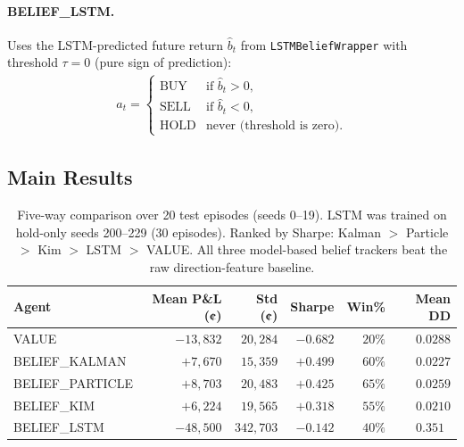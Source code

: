 \documentclass[11pt]{article}
\begin{document}
\paragraph{BELIEF\_LSTM.}
Uses the LSTM-predicted future return $\hat{b}_t$ from \texttt{LSTMBeliefWrapper}
with threshold $\tau = 0$ (pure sign of prediction):
\begin{align*}
a_t = \begin{cases}
\text{BUY}  & \text{if } \hat{b}_t > 0, \\
\text{SELL} & \text{if } \hat{b}_t < 0, \\
\text{HOLD} & \text{never (threshold is zero).}
\end{cases}
\end{align*}

\subsection{Main Results}
\label{sec:results}

\begin{table}[H]
\centering
\begin{tabular}{lrrrrr}
\toprule
\textbf{Agent} & \textbf{Mean P\&L (¢)} & \textbf{Std (¢)} & \textbf{Sharpe} & \textbf{Win\%} & \textbf{Mean DD} \\
\midrule
VALUE            & $-13{,}832$  & $20{,}284$  & $-0.682$ & $20\%$ & $0.0288$ \\
BELIEF\_KALMAN   & $+7{,}670$   & $15{,}359$  & $+0.499$ & $60\%$ & $0.0227$ \\
BELIEF\_PARTICLE & $+8{,}703$   & $20{,}483$  & $+0.425$ & $65\%$ & $0.0259$ \\
BELIEF\_KIM      & $+6{,}224$   & $19{,}565$  & $+0.318$ & $55\%$ & $0.0210$ \\
BELIEF\_LSTM     & $-48{,}500$  & $342{,}703$ & $-0.142$ & $40\%$ & $0.351\phantom{0}$ \\
\bottomrule
\end{tabular}
\caption{Five-way comparison over 20 test episodes (seeds 0--19).
LSTM was trained on hold-only seeds 200--229 (30 episodes).
Ranked by Sharpe: Kalman $>$ Particle $>$ Kim $>$ LSTM $>$ VALUE.
All three model-based belief trackers beat the raw direction-feature baseline.}
\label{tab:main}
\end{table}
\end{document}
